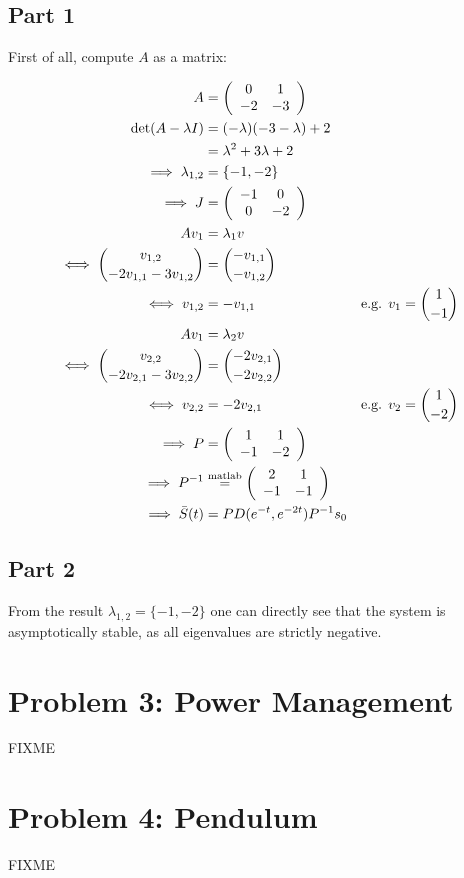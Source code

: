 \documentclass[a4paper,parskip,headheight=38pt]{scrartcl} %
\begin{document}
\subsection*{Part 1}

First of all, compute $A$ as a matrix:

\begin{align*}
    A &= \left( \begin{array}{cc} 0 & 1 \\ -2 & -3 \end{array} \right) \\
    \det(A - \lambda I) &= (-\lambda)(-3-\lambda) + 2 \\
    &= \lambda^2 + 3\lambda + 2 \\
    \implies \lambda_{1,2} &= \{-1, -2\} \\
    \implies J &= \left( \begin{array}{cc} -1 & 0 \\ 0 & -2 \end{array} \right) \\
    Av_1 &= \lambda_1 v \\
    \iff \binom{v_{1,2}}{-2v_{1,1}-3v_{1,2}} &= \binom{-v_{1,1}}{-v_{1,2}} \\
    \iff v_{1,2} &= -v_{1,1} & \text{e.g. } v_1 = \binom{1}{-1} \\
    Av_1 &= \lambda_2 v \\
    \iff \binom{v_{2,2}}{-2v_{2,1}-3v_{2,2}} &= \binom{-2v_{2,1}}{-2v_{2,2}} \\
    \iff v_{2,2} &= -2 v_{2,1} & \text{e.g. } v_2 = \binom{1}{-2} \\
    \implies P &= \left( \begin{array}{cc} 1 & 1 \\ -1 & -2 \end{array} \right) \\
    \implies P^{-1} &\overset{\text{\scriptsize{matlab}}}{=} \left( \begin{array}{cc} 2 & 1 \\ -1 & -1 \end{array} \right) \\
    \implies \bar{S}(t) &= P D(e^{-t}, e^{-2t}) P^{-1} s_0
\end{align*}

\subsection*{Part 2}

From the result $\lambda_{1,2} = \{-1, -2\}$ one can directly see that
the system is asymptotically stable, as all eigenvalues are strictly
negative.


 \pagebreak{}
\section*{Problem 3: Power Management}

FIXME


\section*{Problem 4: Pendulum}

FIXME
\end{document}
